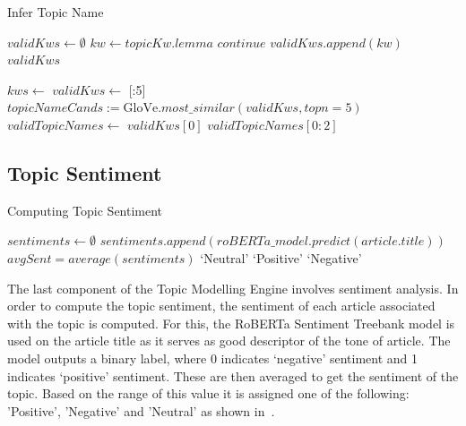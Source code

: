 \begin{algorithm}[H]
  \caption{Infer Topic Name}
  \label{alg:topic_name}
  \begin{algorithmic}   
    \State $validKws \gets \emptyset$
    \State $kw \gets topicKw.lemma$
    \State $continue$
    \EndIf
    \State $validKws.append(kw)$
    \EndFor
    \State \Return $validKws$
  \EndFunction

\vspace{1em}
    \State $kws \gets$ 
    \State $validKws \gets$ [:5]
    \State $topicNameCands := \text{GloVe}.most\_similar(validKws, topn=5)$
    \State $validTopicNames \gets$ 
    \State \Return $validKws[0]$
    \Else
    \State \Return $validTopicNames[0:2]$
    \EndIf
  \EndFunction
\end{algorithmic}
\end{algorithm}
\vspace{-1ex}
\subsection*{Topic Sentiment}
\vspace{-1ex}
\begin{algorithm}[H]
  \caption{Computing Topic Sentiment}
  \label{alg:topic_sent}
  \begin{algorithmic}   
    \State $sentiments \gets  \emptyset$
    \State $sentiments.append(roBERTa\_model.predict(article.title))$ 
    \EndFor
    \State $avgSent = average(sentiments)$
    \State \Return `Neutral'
      \Return `Positive'
    \Else  \Return `Negative'\EndIf
  \EndFunction
\end{algorithmic}
\end{algorithm}
\vspace{-1.5ex}
The last component of the Topic Modelling Engine involves sentiment analysis. In order to compute the topic sentiment, the sentiment of each article associated with the topic is computed. For this, the RoBERTa Sentiment Treebank model is used on the article title as it serves as good descriptor of the tone of article. The model outputs a binary label, where 0 indicates `negative' sentiment and 1 indicates `positive' sentiment. These are then averaged to get the sentiment of the topic. Based on the range of this value it is assigned one of the following: 'Positive', 'Negative' and 'Neutral' as shown in~.

